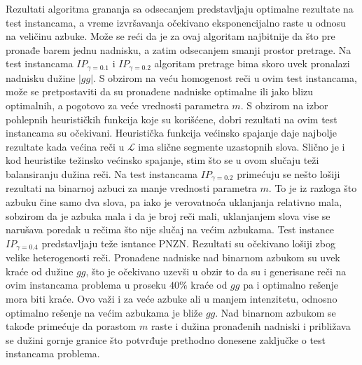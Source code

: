 \documentclass[12pt,oneside]{memoir}
\begin{document}
Rezultati algoritma grananja sa odsecanjem predstavljaju optimalne rezultate
na test instancama, a vreme izvršavanja očekivano eksponencijalno raste u odnosu na
veličinu azbuke. Može se reći da je za ovaj algoritam najbitnije da što pre pronađe barem jednu
nadnisku, a zatim odsecanjem smanji prostor pretrage.
Na test instancama $IP_{\gamma=0.1}$ i $IP_{\gamma=0.2}$ algoritam pretrage bima
skoro uvek pronalazi nadnisku dužine $|gg|$. S obzirom na veću homogenost reči
u ovim test instancama, može se pretpostaviti da su pronađene nadniske
optimalne ili jako blizu optimalnih, a pogotovo za veće vrednosti parametra $m$.
S obzirom na izbor pohlepnih heurističkih funkcija koje su korišćene,
dobri rezultati na ovim test instancama su očekivani.
Heuristička funkcija većinsko spajanje daje najbolje rezultate
kada većina reči u $\mathcal{L}$ ima slične segmente uzastopnih slova.
Slično je i kod heuristike težinsko većinsko spajanje, stim što se u ovom
slučaju teži balansiranju dužina reči.
Na test instancama $IP_{\gamma=0.2}$ primećuju se nešto lošiji rezultati
na binarnoj azbuci za manje vrednosti parametra $m$. To je iz razloga
što azbuku čine samo dva slova, pa iako je verovatnoća uklanjanja relativno mala,
sobzirom da je azbuka mala i da je broj reči mali, uklanjanjem
slova vise se narušava poredak u rečima što nije slučaj na većim azbukama.
Test instance $IP_{\gamma=0.4}$ predstavljaju teže isntance PNZN.
Rezultati su očekivano lošiji zbog velike heterogenosti reči. Pronađene nadniske nad binarnom azbukom
su uvek kraće od dužine $gg$, što je očekivano uzevši u obzir to da su i generisane
reči na ovim instancama problema u proseku $40\%$ kraće od $gg$ pa i optimalno rešenje
mora biti kraće. Ovo važi i za veće azbuke ali u manjem intenzitetu,
odnosno optimalno rešenje na većim azbukama je bliže $gg$.
Nad binarnom azbukom se takođe primećuje da porastom $m$ raste i dužina pronađenih nadniski
i približava se dužini gornje granice što potvrđuje prethodno donesene zaključke
o test instancama problema.
\end{document}
